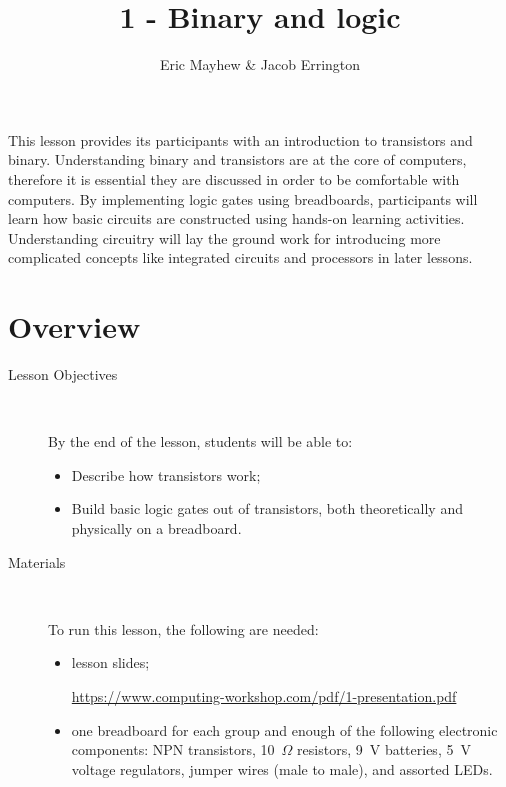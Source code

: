 \documentclass[11pt]{article}
\title{1 - Binary and logic}
\author{Eric Mayhew \& Jacob Errington}
\date{}
\newcommand{\cwurl}{https://www.computing-workshop.com/}
\newcommand{\cwpdf}{\cwurl pdf/}
\begin{document}
\maketitle
This lesson provides its participants with an introduction to transistors and
binary. Understanding binary and transistors are at the core of computers,
therefore it is essential they are discussed in order to be comfortable with
computers. By implementing logic gates using breadboards, participants will learn how basic circuits are
constructed using hands-on learning activities. Understanding circuitry will lay the ground work for
introducing more complicated concepts like integrated circuits and processors in later lessons.

\section*{Overview}

\begin{description}
  \item[Lesson Objectives] ~

   By the end of the lesson, students will be able to:

  \begin{itemize}

    \item Describe how transistors work;

    \item Build basic logic gates out of transistors, both theoretically and
      physically on a breadboard.

  \end{itemize}

  \item [Materials]~

    To run this lesson, the following are needed:

    \begin{itemize}
      \item
        lesson slides;

        \url{\cwpdf 1-presentation.pdf}

      \item
        one breadboard for each group and enough of the following electronic
        components:
        NPN transistors,
        10~$\Omega$ resistors,
        9~V batteries,
        5~V voltage regulators,
        jumper wires (male to male),
        and assorted LEDs.

    \end{itemize}
\end{description}
\end{document}
